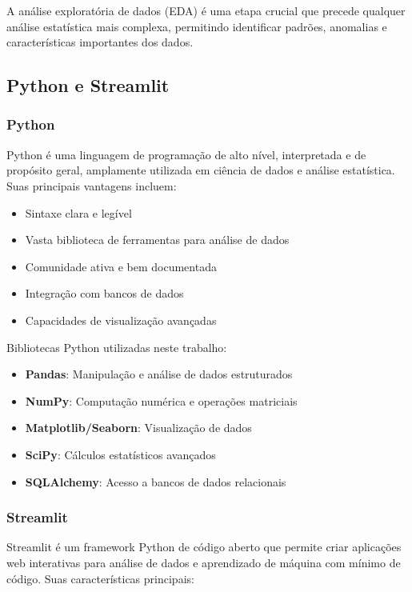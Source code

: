 \documentclass[12pt,a4paper]{article}
\begin{document}
A análise exploratória de dados (EDA) é uma etapa crucial que precede qualquer análise estatística mais complexa, permitindo identificar padrões, anomalias e características importantes dos dados.

\subsection{Python e Streamlit}

\subsubsection{Python}

Python é uma linguagem de programação de alto nível, interpretada e de propósito geral, amplamente utilizada em ciência de dados e análise estatística. Suas principais vantagens incluem:

\begin{itemize}
    \item Sintaxe clara e legível
    \item Vasta biblioteca de ferramentas para análise de dados
    \item Comunidade ativa e bem documentada
    \item Integração com bancos de dados
    \item Capacidades de visualização avançadas
\end{itemize}

Bibliotecas Python utilizadas neste trabalho:
\begin{itemize}
    \item \textbf{Pandas}: Manipulação e análise de dados estruturados
    \item \textbf{NumPy}: Computação numérica e operações matriciais
    \item \textbf{Matplotlib/Seaborn}: Visualização de dados
    \item \textbf{SciPy}: Cálculos estatísticos avançados
    \item \textbf{SQLAlchemy}: Acesso a bancos de dados relacionais
\end{itemize}

\subsubsection{Streamlit}

Streamlit é um framework Python de código aberto que permite criar aplicações web interativas para análise de dados e aprendizado de máquina com mínimo de código. Suas características principais:
\end{document}
